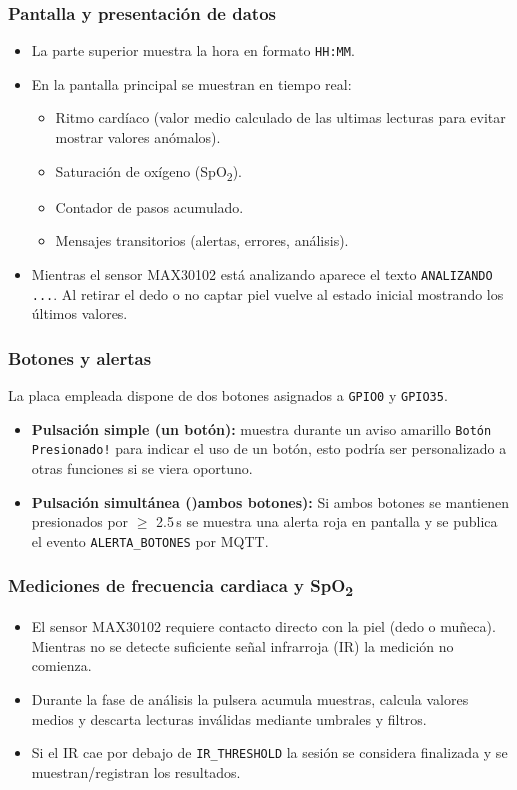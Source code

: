 \documentclass[12pt, a4paper]{article}
\begin{document}
\begin{umaappendices}
	\subsubsection{Pantalla y presentación de datos}
	\begin{itemize}
		\item La parte superior muestra la hora en formato \texttt{HH:MM}.
		\item En la pantalla principal se muestran en tiempo real:
		\begin{itemize}
			\item Ritmo cardíaco (valor medio calculado de las ultimas lecturas para evitar mostrar valores anómalos).
			\item Saturación de oxígeno (SpO\textsubscript{2}).
			\item Contador de pasos acumulado.
			\item Mensajes transitorios (alertas, errores, análisis).
		\end{itemize}
		\item Mientras el sensor MAX30102 está analizando aparece el texto \texttt{ANALIZANDO ...}. Al retirar el dedo o no captar piel vuelve al estado inicial mostrando los últimos valores.
	\end{itemize}
	
	\subsubsection{Botones y alertas}
	La placa empleada dispone de dos botones asignados a \texttt{GPIO0} y \texttt{GPIO35}. 
	\begin{itemize}
		\item \textbf{Pulsación simple (un botón):} muestra durante un aviso amarillo \texttt{Botón Presionado!} para indicar el uso de un botón, esto podría ser personalizado a otras funciones si se viera oportuno.
		\item \textbf{Pulsación simultánea ()ambos botones):} Si ambos botones se mantienen presionados por \(\geq\) 2.5\,s se muestra una alerta roja en pantalla y se publica el evento \texttt{ALERTA\_BOTONES} por MQTT.
	\end{itemize}
	
	\subsubsection{Mediciones de frecuencia cardiaca y SpO\textsubscript{2}}
	\begin{itemize}
		\item El sensor MAX30102 requiere contacto directo con la piel (dedo o muñeca). Mientras no se detecte suficiente señal infrarroja (IR) la medición no comienza.
		\item Durante la fase de análisis la pulsera acumula muestras, calcula valores medios y descarta lecturas inválidas mediante umbrales y filtros.
		\item Si el IR cae por debajo de \texttt{IR\_THRESHOLD} la sesión se considera finalizada y se muestran/registran los resultados.
	\end{itemize}
	

\end{umaappendices}
\end{document}
